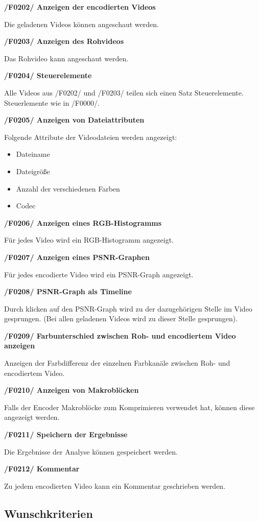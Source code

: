 \documentclass[parskip=full]{scrartcl}
\begin{document}
\textbf{/F0202/ Anzeigen der encodierten Videos}

Die geladenen Videos können angeschaut werden.

\textbf{/F0203/ Anzeigen des Rohvideos}

Das Rohvideo kann angeschaut werden.

\textbf{/F0204/ Steuerelemente}

Alle Videos aus /F0202/ und /F0203/ teilen sich einen Satz Steuerelemente. Steuerlemente wie in /F0000/.

\textbf{/F0205/ Anzeigen von Dateiattributen}

Folgende Attribute der Videodateien werden angezeigt:
\begin{itemize}
\item Dateiname
\item Dateigröße
\item Anzahl der verschiedenen Farben
\item Codec
\end{itemize}

\textbf{/F0206/ Anzeigen eines RGB-Histogramms}

Für jedes Video wird ein RGB-Histogramm angezeigt.

\textbf{/F0207/ Anzeigen eines PSNR-Graphen}

Für jedes encodierte Video wird ein PSNR-Graph angezeigt.

\textbf{/F0208/ PSNR-Graph als Timeline}

Durch klicken auf den PSNR-Graph wird zu der dazugehörigen Stelle im Video gesprungen. (Bei allen geladenen Videos wird zu dieser Stelle gesprungen).

\textbf{/F0209/ Farbunterschied zwischen Roh- und encodiertem Video anzeigen}

Anzeigen der Farbdifferenz der einzelnen Farbkanäle zwischen Roh- und encodiertem Video.

\textbf{/F0210/ Anzeigen von Makroblöcken}

Falls der Encoder Makroblöcke zum Komprimieren verwendet hat, können diese angezeigt werden.

\textbf{/F0211/ Speichern der Ergebnisse}

Die Ergebnisse der Analyse können gespeichert werden.

\textbf{/F0212/ Kommentar}

Zu jedem encodierten Video kann ein Kommentar geschrieben werden.
\subsection{Wunschkriterien}
\end{document}

